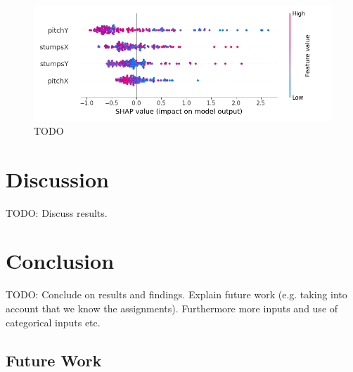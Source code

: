 \documentclass[12pt,a4paper]{report}
\theoremstyle{definition}
\begin{document}
\begin{figure}[H]
    \centering
    \includegraphics[width=\linewidth]{stumps_pitch_shap.png}
    \caption{TODO}
    \label{fig:ShapStumpsPitch}
\end{figure}

\chapter{Discussion}

TODO: Discuss results.

\chapter{Conclusion}

TODO: Conclude on results and findings. Explain future work (e.g. taking into account that we know the assignments). Furthermore more inputs and use of categorical inputs etc.

\section{Future Work}

\end{document}
